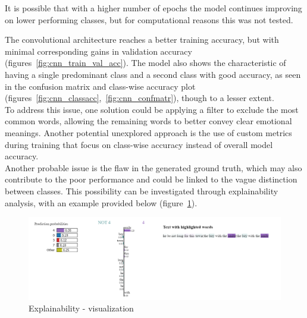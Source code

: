 It is possible that with a higher number of epochs the model continues improving
on lower performing classes, but for computational reasons this was not tested.

The convolutional architecture reaches a better training accuracy, but with minimal
corresponding gains in validation accuracy
(figures~\ref{fig:cnn_train_val_acc}).
The model also shows the characteristic of having a single
predominant class and a second class with good accuracy, as seen in
the confusion matrix and class-wise accuracy plot
(figures~\ref{fig:cnn_classacc},~\ref{fig:cnn_confmatr}), though
to a lesser extent.\\

To address this issue, one solution could be applying a filter to exclude the most
common words, allowing the remaining words to better convey clear emotional
meanings. Another potential unexplored approach is the use of custom
metrics during training that focus on class-wise accuracy instead of overall model
accuracy.\\

Another probable issue is the flaw in the generated ground truth, which may
also contribute to the poor performance and could be linked to the vague distinction
between classes.
This possibility can be investigated through explainability analysis, with an
example provided below (figure~\ref{fig:expl}).

\begin{figure}[H]
    \centering
    \includegraphics[scale= 0.55]{pictures/expl.png}
    \caption{Explainability - visualization}
    \label{fig:expl}
\end{figure}

